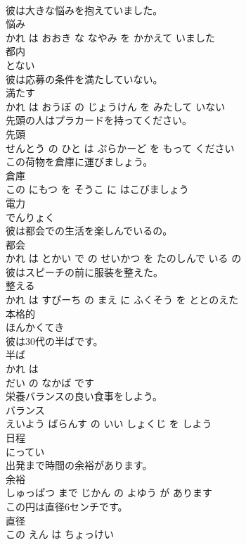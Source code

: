 \documentclass[8pt]{extreport}
\begin{document}
\begin{CJK}{UTF8}{min}
\\	彼は大きな悩みを抱えていました。	
\\	悩み 
\\	かれ は おおき な なやみ を かかえて いました			
\\	都内	
\\	とない			
\\	彼は応募の条件を満たしていない。	
\\	満たす 
\\	かれ は おうぼ の じょうけん を みたして いない			
\\	先頭の人はプラカードを持ってください。	
\\	先頭 
\\	せんとう の ひと は ぷらかーど を もって ください			
\\	この荷物を倉庫に運びましょう。	
\\	倉庫 
\\	この にもつ を そうこ に はこびましょう			
\\	電力	
\\	でんりょく			
\\	彼は都会での生活を楽しんでいるの。	
\\	都会 
\\	かれ は とかい で の せいかつ を たのしんで いる の			
\\	彼はスピーチの前に服装を整えた。	
\\	整える 
\\	かれ は すぴーち の まえ に ふくそう を ととのえた			
\\	本格的	
\\	ほんかくてき			
\\	彼は30代の半ばです。	
\\	半ば 
\\	かれ は 
\\	だい の なかば です			
\\	栄養バランスの良い食事をしよう。	
\\	バランス 
\\	えいよう ばらんす の いい しょくじ を しよう			
\\	日程	
\\	にってい			
\\	出発まで時間の余裕があります。	
\\	余裕 
\\	しゅっぱつ まで じかん の よゆう が あります			
\\	この円は直径6センチです。	
\\	直径 
\\	この えん は ちょっけい 

\end{CJK}
\end{document}
